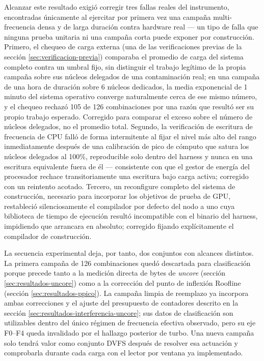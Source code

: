 \documentclass[12pt,oneside,spanish]{book}
\begin{document}
Alcanzar este resultado exigió corregir tres fallas reales del instrumento, encontradas únicamente al ejercitar por primera vez una campaña multi-frecuencia densa y de larga duración contra hardware real --- un tipo de falla que ninguna prueba unitaria ni una campaña corta puede exponer por construcción. Primero, el chequeo de carga externa (una de las verificaciones previas de la sección \ref{sec:verificacion-previa}) comparaba el promedio de carga del sistema completo contra un umbral fijo, sin distinguir el trabajo legítimo de la propia campaña sobre sus núcleos delegados de una contaminación real; en una campaña de una hora de duración sobre 6 núcleos dedicados, la media exponencial de 1 minuto del sistema operativo converge naturalmente cerca de ese mismo número, y el chequeo rechazó 105 de 126 combinaciones por una razón que resultó ser su propio trabajo esperado. Corregido para comparar el exceso sobre el número de núcleos delegados, no el promedio total. Segundo, la verificación de escritura de frecuencia de CPU falló de forma intermitente al fijar el nivel más alto del rango inmediatamente después de una calibración de pico de cómputo que satura los núcleos delegados al 100\%, reproducible solo dentro del harness y nunca en una escritura equivalente fuera de él --- consistente con que el gestor de energía del procesador rechace transitoriamente una escritura bajo carga activa; corregido con un reintento acotado. Tercero, un reconfigure completo del sistema de construcción, necesario para incorporar los objetivos de prueba de GPU, restableció silenciosamente el compilador por defecto del nodo a uno cuya biblioteca de tiempo de ejecución resultó incompatible con el binario del harness, impidiendo que arrancara en absoluto; corregido fijando explícitamente el compilador de construcción.

La secuencia experimental deja, por tanto, dos conjuntos con alcances distintos. La primera campaña de 126 combinaciones quedó descartada para clasificación porque precede tanto a la medición directa de bytes de \textit{uncore} (sección \ref{sec:resultados-uncore}) como a la corrección del punto de inflexión Roofline (sección \ref{sec:resultados-ppico}). La campaña limpia de reemplazo ya incorpora ambas correcciones y el ajuste del presupuesto de contadores descrito en la sección \ref{sec:resultados-interferencia-uncore}; sus datos de clasificación son utilizables dentro del único régimen de frecuencia efectiva observado, pero su eje F0--F4 queda invalidado por el hallazgo posterior de turbo. Una nueva campaña solo tendrá valor como conjunto DVFS después de resolver esa actuación y comprobarla durante cada carga con el lector por ventana ya implementado.
\end{document}
